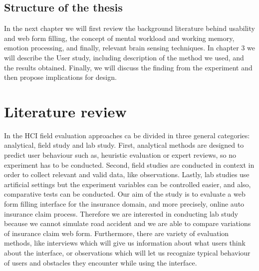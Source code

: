 \documentclass[a4paper]{report}
\begin{document}
	\section{Structure of the thesis}
		In the next chapter we will first review the background literature behind usability and web form filling, the concept of mental workload and working memory, emotion processing, and finally, relevant brain sensing techniques. In chapter 3 we will describe the User study, including description of the method we used, and the results obtained. Finally, we will discuss the finding from the experiment and then propose implications for design.
\chapter{Literature review}
	In the HCI field  evaluation approaches ca be divided in three general categories: analytical, field study and lab study\cite{rogers2007interaction}. First, analytical methods are designed to predict user behaviour such as, heuristic evaluation or expert reviews, so no experiment has to be conducted. Second, field studies are conducted in context in order to collect relevant and valid data, like observations. Lastly, lab studies use artificial settings but the experiment variables can be controlled easier, and also, comparative tests can be conducted. Our aim of the study is to evaluate a web form filling interface for the insurance domain, and more precisely, online auto insurance claim process. Therefore we are interested in conducting lab study because we cannot simulate road accident and we are able to compare variations of insurance claim web form. Furthermore, there are variety of evaluation methods, like interviews which will give us information about what users think about the interface, or observations which will let us recognize typical behaviour of users and obstacles they encounter while using the interface.\\
	
\end{document}
